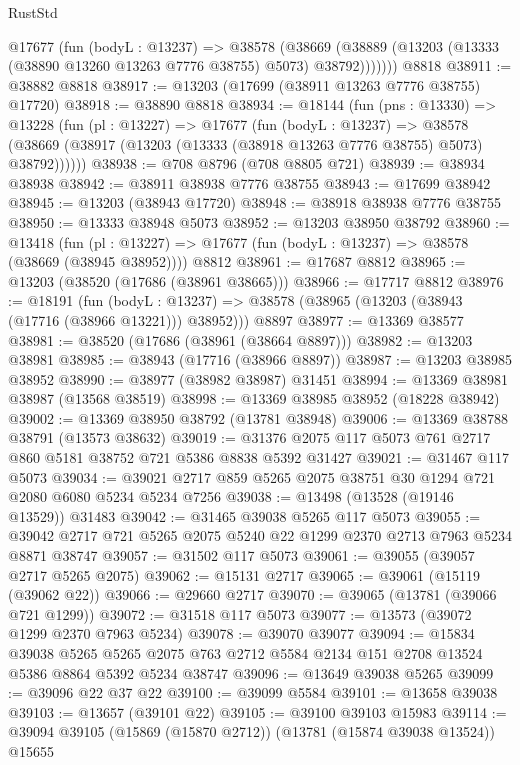 \begin{lexlean}{RustStd}
\begin{coremodule}
        @17677
          (fun (bodyL : @13237) =>
          @38578
            (@38669 (@38889 (@13203 (@13333 (@38890 @13260 @13263 @7776 @38755) @5073) @38792)))))))
    @8818
@38911 := @38882 @8818
@38917 := @13203 (@17699 (@38911 @13263 @7776 @38755) @17720)
@38918 := @38890 @8818
@38934 := @18144
    (fun (pns : @13330) =>
    @13228
      (fun (pl : @13227) =>
      @17677
        (fun (bodyL : @13237) =>
        @38578 (@38669 (@38917 (@13203 (@13333 (@38918 @13263 @7776 @38755) @5073) @38792))))))
@38938 := @708 @8796 (@708 @8805 @721)
@38939 := @38934 @38938
@38942 := @38911 @38938 @7776 @38755
@38943 := @17699 @38942
@38945 := @13203 (@38943 @17720)
@38948 := @38918 @38938 @7776 @38755
@38950 := @13333 @38948 @5073
@38952 := @13203 @38950 @38792
@38960 := @13418
    (fun (pl : @13227) => @17677 (fun (bodyL : @13237) => @38578 (@38669 (@38945 @38952))))
    @8812
@38961 := @17687 @8812
@38965 := @13203 (@38520 (@17686 (@38961 @38665)))
@38966 := @17717 @8812
@38976 := @18191
    (fun (bodyL : @13237) => @38578 (@38965 (@13203 (@38943 (@17716 (@38966 @13221))) @38952)))
    @8897
@38977 := @13369 @38577
@38981 := @38520 (@17686 (@38961 (@38664 @8897)))
@38982 := @13203 @38981
@38985 := @38943 (@17716 (@38966 @8897))
@38987 := @13203 @38985 @38952
@38990 := @38977 (@38982 @38987) @31451
@38994 := @13369 @38981 @38987 (@13568 @38519)
@38998 := @13369 @38985 @38952 (@18228 @38942)
@39002 := @13369 @38950 @38792 (@13781 @38948)
@39006 := @13369 @38788 @38791 (@13573 @38632)
@39019 := @31376 @2075 @117 @5073 @761 @2717 @860 @5181 @38752 @721 @5386 @8838 @5392 @31427
@39021 := @31467 @117 @5073
@39034 := @39021 @2717 @859 @5265 @2075 @38751 @30 @1294 @721 @2080 @6080 @5234 @5234 @7256
@39038 := @13498 (@13528 (@19146 @13529)) @31483
@39042 := @31465 @39038 @5265 @117 @5073
@39055 := @39042 @2717 @721 @5265 @2075 @5240 @22 @1299 @2370 @2713 @7963 @5234 @8871 @38747
@39057 := @31502 @117 @5073
@39061 := @39055 (@39057 @2717 @5265 @2075)
@39062 := @15131 @2717
@39065 := @39061 (@15119 (@39062 @22))
@39066 := @29660 @2717
@39070 := @39065 (@13781 (@39066 @721 @1299))
@39072 := @31518 @117 @5073
@39077 := @13573 (@39072 @1299 @2370 @7963 @5234)
@39078 := @39070 @39077
@39094 := @15834
    @39038
    @5265
    @5265
    @2075
    @763
    @2712
    @5584
    @2134
    @151
    @2708
    @13524
    @5386
    @8864
    @5392
    @5234
    @38747
@39096 := @13649 @39038 @5265
@39099 := @39096 @22 @37 @22
@39100 := @39099 @5584
@39101 := @13658 @39038
@39103 := @13657 (@39101 @22)
@39105 := @39100 @39103 @15983
@39114 := @39094 @39105 (@15869 (@15870 @2712)) (@13781 (@15874 @39038 @13524)) @15655

\end{coremodule}
\end{lexlean}
